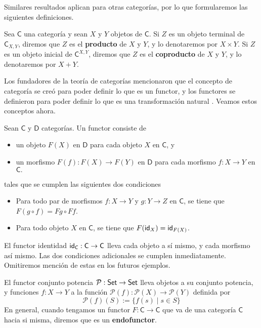 \documentclass[../main.tex]{subfiles}
\begin{document}
Similares resultados aplican para otras categor\'ias, por lo que formularemos las siguientes definiciones.

\begin{definitionap}
    Sea $\mathsf{C}$ una categor\'ia y sean $X$ y $Y$ objetos de $\mathsf{C}$.
    Si $Z$ es un objeto terminal de $\mathsf{C}_{X,Y}$, diremos que $Z$ es el \textbf{producto} de $X$ y $Y$, y lo denotaremos por $X \times Y$.
    Si $Z$ es un objeto inicial de $\mathsf{C}^{X,Y}$, diremos que $Z$ es el \textbf{coproducto} de $X$ y $Y$, y lo denotaremos por $X + Y$.
\end{definitionap}

Los fundadores de la teor\'ia de categor\'ias mencionaron que el concepto de categor\'ia se cre\'o para poder definir lo que es un functor, y los functores se definieron para poder definir lo que es una transformaci\'on natural \cite{mac_lane_categories_2010}. Veamos estos conceptos ahora.

\begin{definitionap}
    Sean $\mathsf{C}$ y $\mathsf{D}$ categor\'ias. Un functor consiste de
    \begin{itemize}
        \item un objeto $F(X)$ en $\mathsf{D}$ para cada objeto $X$ en $\mathsf{C}$, y
        \item un morfismo $F(f):F(X) \to F(Y)$ en $\mathsf{D}$ para cada morfismo $f:X \to Y$ en $\mathsf{C}.$
    \end{itemize}
    tales que se cumplen las siguientes dos condiciones
    \begin{itemize}
        \item Para todo par de morfismos $f: X \to Y$ y $g: Y \to Z$ en $\mathsf{C}$, se tiene que $F(g \circ f) = F g \circ F f$.
        \item Para todo objeto $X$ en $\mathsf{C}$, se tiene que $F(\idfunc[X])=\idfunc[F(X)]$.
    \end{itemize}
\end{definitionap}

\begin{exampleap}
    El functor identidad $\idfunc[\mathsf{C}]:\mathsf{C} \to\mathsf{C}$ lleva cada objeto a s\'i mismo, y cada morfismo as\'i mismo. Las dos condiciones adicionales se cumplen inmediatamente.
    Omitiremos menci\'on de estas en los futuros ejemplos.
\end{exampleap}

\begin{exampleap}
    El functor conjunto potencia $\mathcal{P}:\set \to \set$ lleva objetos a su conjunto potencia, y funciones $f:X \to Y$ a la funci\'on $\mathcal{P}(f):\mathcal{P}(X) \to \mathcal{P}(Y)$ definida por
    \[ \mathcal{P}(f)(S) := \{ f(s) \mid s \in S \} \]
    En general, cuando tengamos un functor $F: \mathsf{C} \to \mathsf{C}$ que va de una categor\'ia $\mathsf{C}$ hacia si misma, diremos que es un \textbf{endofunctor}.
\end{exampleap}
\end{document}
